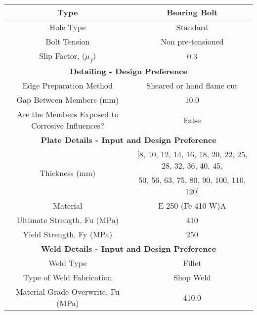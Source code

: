 \documentclass{article}%
\begin{document}
\begin{longtable}{|p{5cm}|p{2.5cm}|p{1.5cm}|p{3cm}|p{3.5cm}|}
\hline%
\hline%
\multicolumn{3}{|c|}{Type}&\multicolumn{2}{|c|}{Bearing Bolt}\\%
\hline%
\hline%
\multicolumn{3}{|c|}{Hole Type}&\multicolumn{2}{|c|}{Standard}\\%
\hline%
\hline%
\multicolumn{3}{|c|}{Bolt Tension}&\multicolumn{2}{|c|}{Non pre{-}tensioned}\\%
\hline%
\hline%
\multicolumn{3}{|c|}{Slip Factor, ($\mu_{f}$)}&\multicolumn{2}{|c|}{0.3}\\%
\hline%
\hline%
\multicolumn{5}{|c|}{\textbf{Detailing {-} Design Preference}}\\%
\hline%
\hline%
\multicolumn{3}{|c|}{Edge Preparation Method}&\multicolumn{2}{|c|}{Sheared or hand flame cut}\\%
\hline%
\hline%
\multicolumn{3}{|c|}{Gap Between Members (mm)}&\multicolumn{2}{|c|}{10.0}\\%
\hline%
\hline%
\multicolumn{3}{|c|}{Are the Members Exposed to Corrosive Influences?}&\multicolumn{2}{|c|}{False}\\%
\hline%
\hline%
\multicolumn{5}{|c|}{\textbf{Plate Details {-} Input and Design Preference}}\\%
\hline%
\multicolumn{3}{|c|}{\multirow{2}{*}{Thickness (mm)}}&\multicolumn{2}{|c|}{{[}8, 10, 12, 14, 16, 18, 20, 22, 25, 28, 32, 36, 40, 45, }\\%
\multicolumn{3}{|c|}{\multirow{2}{*}{}}&\multicolumn{2}{|c|}{50, 56, 63, 75, 80, 90, 100, 110, 120{]}}\\%
\hline%
\hline%
\multicolumn{3}{|c|}{Material}&\multicolumn{2}{|c|}{E 250 (Fe 410 W)A}\\%
\hline%
\hline%
\multicolumn{3}{|c|}{Ultimate Strength, Fu (MPa)}&\multicolumn{2}{|c|}{410}\\%
\hline%
\hline%
\multicolumn{3}{|c|}{Yield Strength, Fy (MPa)}&\multicolumn{2}{|c|}{250}\\%
\hline%
\hline%
\multicolumn{5}{|c|}{\textbf{Weld Details {-} Input and Design Preference}}\\%
\hline%
\hline%
\multicolumn{3}{|c|}{Weld Type}&\multicolumn{2}{|c|}{Fillet}\\%
\hline%
\hline%
\multicolumn{3}{|c|}{Type of Weld Fabrication}&\multicolumn{2}{|c|}{Shop Weld}\\%
\hline%
\hline%
\multicolumn{3}{|c|}{Material Grade Overwrite, Fu (MPa)}&\multicolumn{2}{|c|}{410.0}\\%
\hline%
\end{longtable}

%
%
\newpage%
\end{document}
